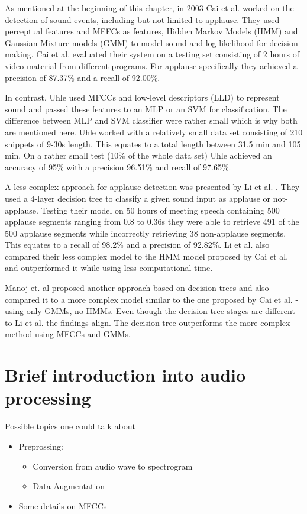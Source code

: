 \documentclass[bsc,frontabs,parskip,deptreport]{infthesis}
\begin{document}
As mentioned at the beginning of this chapter, in 2003 Cai et al. \cite{cai2003highlight} worked on the detection of sound events, including but not limited to applause.
They used perceptual features and MFFCs as features, Hidden Markov Models (HMM) and Gaussian Mixture models (GMM) to model sound and log likelihood for decision making.
Cai et al. evaluated their system on a testing set consisting of 2 hours of video material from different programs.
For applause specifically they achieved a precision of 87.37\% and a recall of 92.00\%.

In contrast, Uhle \cite{uhle2011applause} used MFCCs and low-level descriptors (LLD) to represent sound and passed these features to an MLP or an SVM for classification.
The difference between MLP and SVM classifier were rather small which is why both are mentioned here.
Uhle worked with a relatively small data set consisting of 210 snippets of 9-30s length. This equates to a total length between 31.5 min and 105 min.
On a rather small test (10\% of the whole data set) Uhle achieved an accuracy of 95\% with a precision 96.51\% and recall of 97.65\%.

A less complex approach for applause detection was presented by Li et al. \cite{li2009characteristics}.
They used a 4-layer decision tree to classify a given sound input as applause or not-applause.
Testing their model on 50 hours of meeting speech containing 500 applause segments ranging from 0.8 to 0.36s they were able to retrieve 491 of the 500 applause segments while incorrectly retrieving 38 non-applause segments.
This equates to a recall of 98.2\% and a precision of 92.82\%. Li et al. also compared their less complex model to the HMM model proposed by Cai et al.\cite{cai2003highlight} and outperformed it while using less computational time.

Manoj et. al \cite{manoj2011novel} proposed another approach based on decision trees and also compared it to a more complex model similar to the one proposed by Cai et al. \cite{cai2003highlight} - using only GMMs, no HMMs.
Even though the decision tree stages are different to Li et al. \cite{li2009characteristics} the findings align. The decision tree outperforms the more complex method using MFCCs and GMMs.  

\section{Brief introduction into audio processing} \label{theory}
Possible topics one could talk about
\begin{itemize}
    \item Preprossing: 
    \begin{itemize}
        \item Conversion from audio wave to spectrogram 
        \item Data Augmentation
    \end{itemize}
    \item Some details on MFCCs 
\end{itemize}
\end{document}
